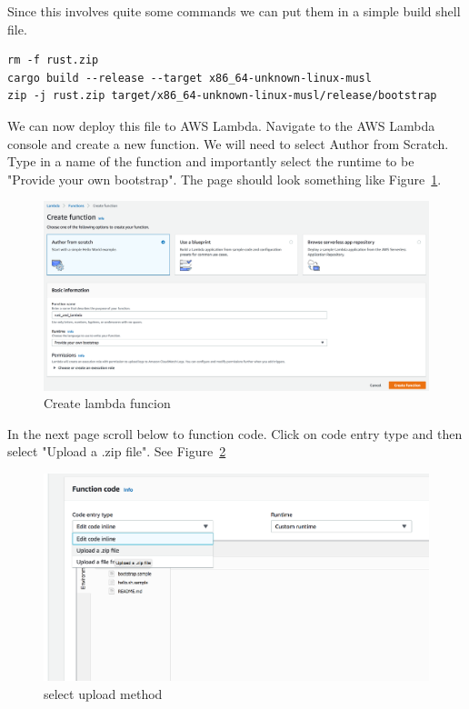 \documentclass{book}
\begin{document}
Since this involves quite some commands we can put them in a simple build shell file.

\begin{lstlisting}[caption={bash}, basicstyle=\small]
rm -f rust.zip
cargo build --release --target x86_64-unknown-linux-musl
zip -j rust.zip target/x86_64-unknown-linux-musl/release/bootstrap
\end{lstlisting}

We can now deploy this file to AWS Lambda. Navigate to the AWS Lambda console and create a new function.  We will need to select Author from Scratch. Type in a name of the function and importantly select the runtime to be "Provide your own bootstrap". The page should look something like Figure~\ref{fig:create_lambda_function}.

\begin{figure}[htpb]
	\centering
	\includegraphics[width=0.8\linewidth]{lambda_create_function.png}
	\caption{Create lambda funcion}
	\label{fig:create_lambda_function}
\end{figure}

In the next page scroll below to function code. Click on code entry type and then select "Upload a .zip file". See Figure~\ref{fig:upload_method}

\begin{figure}[htpb]
	\centering
	\includegraphics[width=0.8\linewidth]{select_upl_zip.png}
	\caption{select upload method}
	\label{fig:upload_method}
\end{figure}
\end{document}
